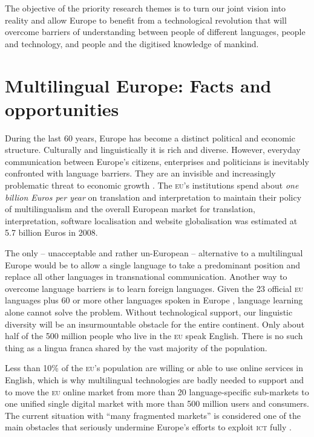 \documentclass[output=paper]{LSP/langsci}
\begin{document}
The objective of the priority research themes is to turn our joint
vision into reality and allow Europe to benefit from a technological
revolution that will overcome barriers of understanding between people
of different languages, people and technology, and people and the
digitised knowledge of mankind.

\section{Multilingual Europe: Facts and opportunities}
\label{sec:background-context}

During the last 60 years, Europe has become a distinct political and
economic structure. Culturally and linguistically it is rich and
diverse. However, everyday communication between Europe's citizens,
enterprises and politicians is inevitably confronted with language
barriers. They are an invisible and increasingly problematic threat to
economic growth \citep{economist12}. The \textsc{eu}'s institutions spend about
\emph{one billion Euros per year} on translation and interpretation to
maintain their policy of multilingualism \citep{EC7} and the overall
European market for translation, interpretation, software localisation
and website globalisation was estimated at 5.7 billion Euros in 2008.

The only -- unacceptable and rather un-European -- alternative to a
multilingual Europe would be to allow a single language to take a
predominant position and replace all other languages in transnational
communication. Another way to overcome language barriers is to learn
foreign languages. Given the 23 official \textsc{eu} languages plus 60 or more
other languages spoken in Europe \citep{eurobarometer2012}, language
learning alone cannot solve the problem. Without technological
support, our linguistic diversity will be an insurmountable obstacle
for the entire continent. Only about half of the 500 million people
who live in the \textsc{eu} speak English. There is no such thing as a lingua
franca shared by the vast majority of the population.

Less than 10\% of the \textsc{eu}'s population are willing or able to use
online services in English, which is why multilingual technologies are
badly needed to support and to move the \textsc{eu} online market from more
than 20 language-specific sub-markets to one unified single digital
market with more than 500 million users and consumers. The current
situation with ``many fragmented markets'' is considered one of the
main obstacles that seriously undermine Europe's efforts to exploit
\textsc{ict} fully \citep{DA2010}.
\end{document}
